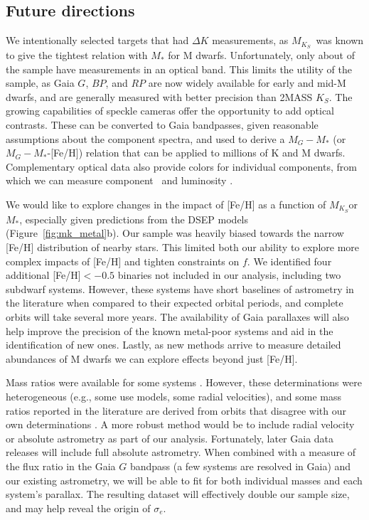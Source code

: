 \documentclass[twocolumn]{aastex62}
\newcommand{\mks}{$M_{K_S}$}
\begin{document}
\subsection{Future directions}

We intentionally selected targets that had $\Delta K$ measurements, as \mks\ was known to give the tightest relation with $M_*$ for M dwarfs. Unfortunately, only about  of the sample have measurements in an optical band. This limits the utility of the sample, as Gaia $G$, $BP$, and $RP$ are now widely available for early and mid-M dwarfs, and are generally measured with better precision than 2MASS $K_S$. The growing capabilities of speckle cameras \citep[e.g.,][]{2009AJ....137.5057H} offer the opportunity to add optical contrasts. These can be converted to Gaia bandpasses, given reasonable assumptions about the component spectra, and used to derive a $M_{G}-M_*$ (or $M_G-M_*$-[Fe/H]) relation that can be applied to millions of K and M dwarfs. Complementary optical data also provide colors for individual components, from which we can measure component \teff\ and luminosity \citep[e.g.,][]{2017ApJ...845...72K}.

We would like to explore changes in the impact of [Fe/H] as a function of \mks or $M_*$, especially given predictions from the DSEP models (Figure~\ref{fig:mk_metal}b). Our sample was heavily biased towards the narrow [Fe/H] distribution of nearby stars. This limited both our ability to explore more complex impacts of [Fe/H] and tighten constraints on $f$. We identified four additional [Fe/H]$<-0.5$ binaries not included in our analysis, including two subdwarf systems. However, these systems have short baselines of astrometry in the literature when compared to their expected orbital periods, and complete orbits will take several more years. The availability of Gaia parallaxes will also help improve the precision of the known metal-poor systems and aid in the identification of new ones. Lastly, as new methods arrive to measure detailed abundances of M dwarfs \citep{Veyette2016a,Veyette2017} we can explore effects beyond just [Fe/H]. 

Mass ratios were available for some systems \citep[e.g.,][]{Soderhjelm1999,Mlg2007b,Dupuy2017}. However, these determinations were heterogeneous (e.g., some use models, some radial velocities), and some mass ratios reported in the literature are derived from orbits that disagree with our own determinations \citep[e.g.,][]{Koh2012}. A more robust method would be to include radial velocity or absolute astrometry as part of our analysis. Fortunately, later Gaia data releases will include full absolute astrometry. When combined with a measure of the flux ratio in the Gaia $G$ bandpass (a few systems are resolved in Gaia) and our existing astrometry, we will be able to fit for both individual masses and each system's parallax. The resulting dataset will effectively double our sample size, and may help reveal the origin of $\sigma_e$. 
\end{document}
